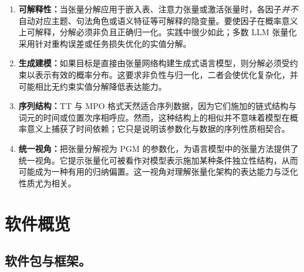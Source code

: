 \begin{enumerate}
\item \textbf{可解释性：}当张量分解应用于嵌入表、注意力张量或激活张量时，各因子\emph{并不}自动对应主题、句法角色或语义特征等可解释的隐变量。要使因子在概率意义上可解释，分解必须非负且正确归一化。实践中很少如此；多数 LLM 张量化采用针对重构误差或任务损失优化的实值分解。

\item \textbf{生成建模：}如果目标是直接由张量网络构建生成式语言模型，则分解必须受约束以表示有效的概率分布。这要求非负性与归一化，二者会使优化复杂化，并可能相比无约束实值分解降低表达能力。

\item \textbf{序列结构：}TT 与 MPO 格式天然适合序列数据，因为它们施加的链式结构与词元的时间或位置次序相呼应。然而，这种结构上的相似并不意味着模型在概率意义上捕获了时间依赖；它只是说明该参数化与数据的序列性质相契合。

\item \textbf{统一视角：}把张量分解视为 PGM 的参数化，为语言模型中的张量方法提供了统一视角。它提示张量化可被看作对模型表示施加某种条件独立性结构，从而可能成为一种有用的归纳偏置。这一视角对理解张量化架构的表达能力与泛化性质尤为相关。
\end{enumerate}


\section{软件概览}
\label{sec:software-overview}


\subsection{软件包与框架。}

